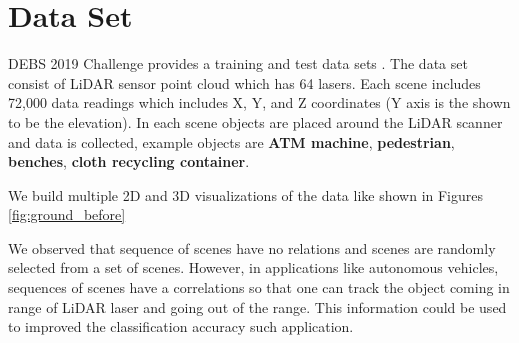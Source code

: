 \section{Data Set}
DEBS 2019  Challenge provides a training and test data sets \cite{DEBSGC2019}. 
The data set consist of LiDAR sensor point cloud which has 64 lasers. Each scene includes 72,000 data readings which includes  X, Y, and Z coordinates (Y axis is the shown to be the elevation). 
In each scene objects are placed around the LiDAR scanner and data is collected, example objects are \textbf{ATM machine}, \textbf{pedestrian}, \textbf{benches}, \textbf{cloth recycling container}. 

We build multiple 2D and 3D visualizations of the data like shown in Figures \ref{fig:ground_before} 

We observed that sequence of scenes have no relations and scenes are randomly selected from a set of scenes. However, in applications like autonomous vehicles, sequences of scenes have a correlations so that one can track the object coming in range of LiDAR laser and going out of the range. This information could be used to improved the classification accuracy such application.    


% 


% 

